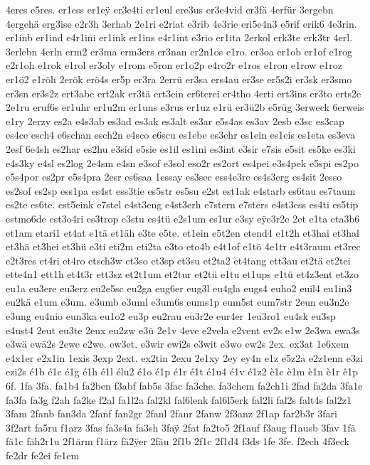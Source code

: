 {4eres
e5res.
er1ess
er1e^^ff
er3e4ti
er1eul
ere3us
er3e4vid
er3fä
4erfür
3ergebn
4ergehä
erg3ise
e2r3h
3erhab
2e1ri
e2riat
e3rib
4e3rie
eri5e4n3
e5rif
erik6
4e3rin.
er1inb
er1ind
e4r1ini
er1ink
er1ins
e4r1int
e3rio
er1ita
2erkol
erk3te
erk3tr
4erl.
3erlebn
4erln
erm2
er3ma
erm3ers
er3nan
er2n1os
e1ro.
er3oa
er1ob
er1of
e1rog
e2r1oh
e1rok
e1rol
er3oly
e1rom
e5ron
er1o2p
e4ro2r
e1ros
e1rou
e1row
e1roz
er1ö2
e1röh
2erök
erö4s
er5p
er3ra
2errü
er3sa
ers4au
er3se
er5s2i
er3sk
er3smo
er3sn
er3s2z
ert3abe
ert2ak
er3tä
ert3ein
er6terei
er4tho
4erti
ert3ins
er3to
erts2e
2e1ru
eruf6s
er1uhr
er1u2m
er1uns
e3rus
er1uz
e1rü
er3ü2b
e5rüg
3erweck
6erweis
e1ry
2erzy
es2a
e4s3ab
es3ad
es3ak
es3alt
es3ar
e5s4as
es3av
2esb
e3sc
es3cap
es4ce
esch4
e6schan
esch2n
e4sco
e6scu
es1ebe
es3ehr
es1ein
es1eis
es1eta
es3eva
2esf
6e4sh
es2har
es2hu
e3sid
e5sie
es1il
es1ini
es3int
e3sir
e7sis
e5sit
es5ke
es3ki
e4s3ky
e4sl
es2log
2e4sm
e4sn
e3sof
e3sol
eso2r
es2ort
es4pei
e3s4pek
e5spi
es2po
e5s4por
es2pr
e5s4pra
2esr
es6saa
1essay
es3sec
ess4e3re
es4s3erg
es4sit
2esso
es2sof
es2sp
ess1pa
es4st
ess3tie
es5str
es5su
e2st
est1ak
e4starb
es6tau
es7taum
es2te
es6te.
est5eink
e7stel
e4st3eng
e4st3erh
e7stern
e7sters
e4st3ess
es4ti
es5tip
estmo6de
est3o4ri
es3trop
e3stu
es4tü
e2s1um
es1ur
e3sy
e^^ffe3r2e
2et
e1ta
eta3b6
et1am
etari1
et4at
e1tä
et1äh
e3te
e5te.
et1ein
e5t2en
etend4
e1t2h
et3hai
et3hal
et3hä
et3hei
et3hü
e3ti
eti2m
eti2ta
e3to
eto4b
e4t1of
e1tö
4e1tr
e4t3raum
et3rec
e2t3res
et4ri
et4ro
etsch3w
et3so
et3sp
et3su
et2ta2
et4tang
ett3au
et2tä
et2tei
ette4n1
ett1h
et4t3r
ett3sz
et2t1um
et2tur
et2tü
e1tu
et1ups
e1tü
et4z3ent
et3zo
eu1a
eu3ere
eu3erz
eu2e5sc
eu2ga
eug6er
eug3l
eu4gla
eugs4
euho2
euil4
eu1in3
eu2kä
e1um
e3um.
e3umb
e3uml
e3um6s
eums1p
eum5st
eum7str
2eun
eu3n2e
e3ung
eu4nio
eun3ka
eu1o2
eu3p
eu2rau
eu3r2e
eur4er
1eu3ro1
eu4sk
eu3sp
e4ust4
2eut
eu3te
2eux
eu2zw
e3ü
2e1v
4eve
e2vela
e2vent
ev2s
e1w
2e3wa
ewa3s
e3wä
ewä2s
2ewe
e2we.
ew3et.
e3wir
ewi2s
e3wit
e3wo
ew2s
2ex.
ex3at
1e6xem
e4x1er
e2x1in
1exis
3exp
2ext.
ex2tin
2exu
2e1xy
2ey
ey4n
e1z
e5z2a
e2z1enn
e3zi
ezi2s
é1b
é1c
é1g
é1h
é1l
élu2
é1o
é1p
é1r
é1t
é1u4
é1v
é1z2
è1c
è1m
è1n
è1r
ê1p
6f.
1fa
3fa.
fa1b4
fa2ben
f3abf
fab5s
3fac
fa3che.
fa3chem
fa2ch1i
2fad
fa2da
3fa1e
fa3fa
fa3g
f2ah
fa2ke
f2al
fa1l2a
fal2kl
fal6lenk
fal6l5erk
fal2li
fal2s
falt4s
fal2z1
3fam
2fanb
fan3da
2fanf
fan2gr
2fanl
2fanr
2fanw
2f3anz
2f1ap
far2b3r
3fari
3f2art
fa5ru
f1arz
3fas
fa3s4a
fa3sh
3fa^^ff
2fat
fa2to5
2f1auf
f3aug
f1ausb
3fav
1fä
fä1c
fäh2r1u
2f1ärm
f1ärz
fä2^^ffer
2fäu
2f1b
2f1c
2f1d4
f3ds
1fe
3fe.
f2ech
4f3eck
fe2dr
fe2ei
fe1em
}

